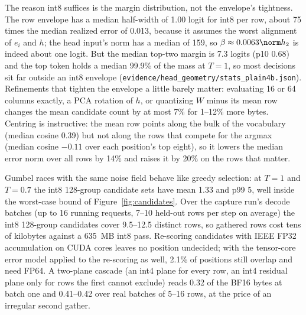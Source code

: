 The reason int8 suffices is the margin distribution, not the envelope's tightness. The row envelope has a median half-width of 1.00 logit for int8 per row, about 75 times the median realized error of 0.013, because it assumes the worst alignment of $e_i$ and $h$; the head input's norm has a median of 159, so $\beta\approx0.0063\norm h_2$ is indeed about one logit. But the median top-two margin is 7.3 logits (p10 0.68) and the top token holds a median 99.9\% of the mass at $T=1$, so most decisions sit far outside an int8 envelope (\nolinkurl{evidence/head_geometry/stats_plain4b.json}). Refinements that tighten the envelope a little barely matter: evaluating 16 or 64 columns exactly, a PCA rotation of $h$, or quantizing $W$ minus its mean row changes the mean candidate count by at most 7\% for 1--12\% more bytes. Centring is instructive: the mean row points along the bulk of the vocabulary (median cosine 0.39) but not along the rows that compete for the argmax (median cosine $-0.11$ over each position's top eight), so it lowers the median error norm over all rows by 14\% and raises it by 20\% on the rows that matter.

Gumbel races with the same noise field behave like greedy selection: at $T=1$ and $T=0.7$ the int8 128-group candidate sets have mean 1.33 and p99 5, well inside the worst-case bound of Figure~\ref{fig:candidates}. Over the capture run's decode batches (up to 16 running requests, 7--10 held-out rows per step on average) the int8 128-group candidates cover 9.5--12.5 distinct rows, so gathered rows cost tens of kilobytes against a 635~MB int8 pass. Re-scoring candidates with IEEE FP32 accumulation on CUDA cores leaves no position undecided; with the tensor-core error model applied to the re-scoring as well, 2.1\% of positions still overlap and need FP64. A two-plane cascade (an int4 plane for every row, an int4 residual plane only for rows the first cannot exclude) reads 0.32 of the BF16 bytes at batch one and 0.41--0.42 over real batches of 5--16 rows, at the price of an irregular second gather.


